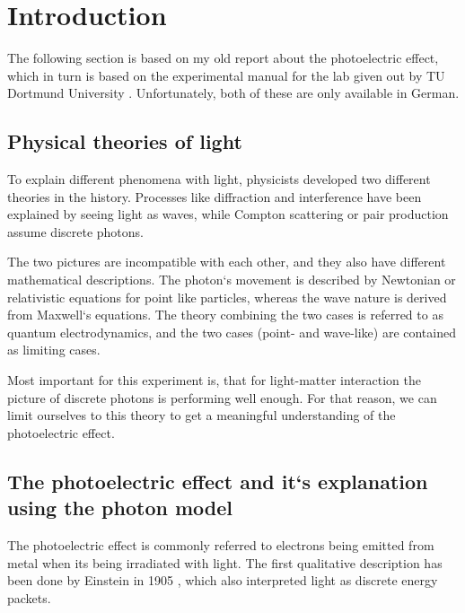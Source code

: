 \section{Introduction}
\label{sec:introduction}
The following section is based on my old report about the photoelectric effect, which in turn is
based on the experimental manual for the lab given out by TU Dortmund University
\cite{V500,anleitung}. Unfortunately,
both of these are only available in German.

\subsection{Physical theories of light}
\label{sec:intr:theory}
To explain different phenomena with light, physicists developed two different theories in the
history. Processes like diffraction and interference have been explained by seeing light as waves,
while Compton scattering or pair production assume discrete photons. 

The two pictures are incompatible with each other, and they also have different mathematical
descriptions. The photon`s movement is described by Newtonian or relativistic equations for
point like particles, whereas the wave nature is derived from Maxwell`s equations. The theory
combining the two cases is referred to as quantum electrodynamics, and the two cases (point- and 
wave-like) are contained as limiting cases.

Most important for this experiment is, that for light-matter interaction the picture of discrete
photons is performing well enough. For that reason, we can limit ourselves to this theory to get a
meaningful understanding of the photoelectric effect.

\subsection{The photoelectric effect and it`s explanation using the photon model}
\label{sec:intr:photoeffect}
The photoelectric effect is commonly referred to electrons being emitted from metal when its being
irradiated with light. The first qualitative description has been done by Einstein in 1905
\cite{https://doi.org/10.1002/andp.19053220607}, which also interpreted light as discrete energy
packets.

